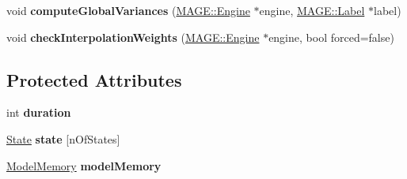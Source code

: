 \begin{DoxyCompactItemize}
\item 
\hypertarget{class_m_a_g_e_1_1_model_adfd98e1d3be9ef4b25a6b544f353f81a}{void {\bfseries compute\-Global\-Variances} (\hyperlink{class_m_a_g_e_1_1_engine}{M\-A\-G\-E\-::\-Engine} $\ast$engine, \hyperlink{class_m_a_g_e_1_1_label}{M\-A\-G\-E\-::\-Label} $\ast$label)}\label{class_m_a_g_e_1_1_model_adfd98e1d3be9ef4b25a6b544f353f81a}

\item 
\hypertarget{class_m_a_g_e_1_1_model_a48c3cee5d400aeba415997b056b2d25e}{void {\bfseries check\-Interpolation\-Weights} (\hyperlink{class_m_a_g_e_1_1_engine}{M\-A\-G\-E\-::\-Engine} $\ast$engine, bool forced=false)}\label{class_m_a_g_e_1_1_model_a48c3cee5d400aeba415997b056b2d25e}

\end{DoxyCompactItemize}
\subsection*{Protected Attributes}
\begin{DoxyCompactItemize}
\item 
\hypertarget{class_m_a_g_e_1_1_model_ab52fc4232cba2bb126f7efed8dff0830}{int {\bfseries duration}}\label{class_m_a_g_e_1_1_model_ab52fc4232cba2bb126f7efed8dff0830}

\item 
\hypertarget{class_m_a_g_e_1_1_model_ac2d75ff326129cf1261b6e90574a1ef4}{\hyperlink{struct_m_a_g_e_1_1_state}{State} {\bfseries state} \mbox{[}n\-Of\-States\mbox{]}}\label{class_m_a_g_e_1_1_model_ac2d75ff326129cf1261b6e90574a1ef4}

\item 
\hypertarget{class_m_a_g_e_1_1_model_a546726e2ff72b89e550fea7fb7a39087}{\hyperlink{class_m_a_g_e_1_1_model_memory}{Model\-Memory} {\bfseries model\-Memory}}\label{class_m_a_g_e_1_1_model_a546726e2ff72b89e550fea7fb7a39087}

\end{DoxyCompactItemize}


